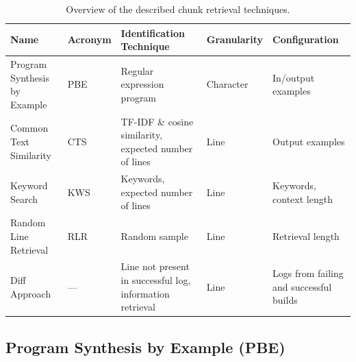 \begin{table}[]
\centering
\caption{Overview of the described chunk retrieval techniques.}
\begin{tabularx}{\columnwidth}{@{}XlXlX@{}} 
\toprule
Name                         & Acronym & Identification Technique                                   & Granularity & Configuration             \\ 
\midrule
Program Synthesis by Example & PBE     & Regular expression program                                 & Character   & In/output examples      \\
Common Text Similarity       & CTS     & TF-IDF \& cosine similarity, expected number of lines & Line        & Output examples           \\
Keyword Search               & KWS     & Keywords, expected number of lines                    & Line        & Keywords, context length  \\
Random Line Retrieval        & RLR     & Random sample                                              & Line        & Retrieval length          \\
Diff Approach                & ---     & Line not present in successful log, information retrieval  & Line        & Logs from failing and successful builds      \\
\bottomrule
\end{tabularx}
\label{tab:ctr}
\end{table}

\subsection{Program Synthesis by Example (PBE)}
\label{sec:expl-pbe}

